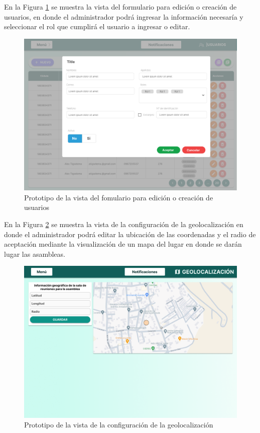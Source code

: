 En la Figura \ref{fig:usuarios formulario} se muestra la vista del formulario para edición o creación de usuarios, en donde el administrador podrá ingresar la información necesaría y seleccionar el rol que cumplirá el usuario a ingresar o editar.

\begin{figure}[H]
    \centering
    \includegraphics[width=1\textwidth]{resources/images/usuarios formulario}
    \caption{Prototipo de la vista del fomulario para edición o creación de usuarios}
    \label{fig:usuarios formulario}
\end{figure}

En la Figura \ref{fig:geolocalizacion} se muestra la vista de la configuración de la geolocalización en donde el administrador podrá editar la ubicación de las coordenadas y el radio de aceptación mediante la visualización de un mapa del lugar en donde se darán lugar las asambleas.

\begin{figure}[H]
    \centering
    \includegraphics[width=1\textwidth]{resources/images/geolocalizacion}
    \caption{Prototipo de la vista de la configuración de la geolocalización}
    \label{fig:geolocalizacion}
\end{figure}

